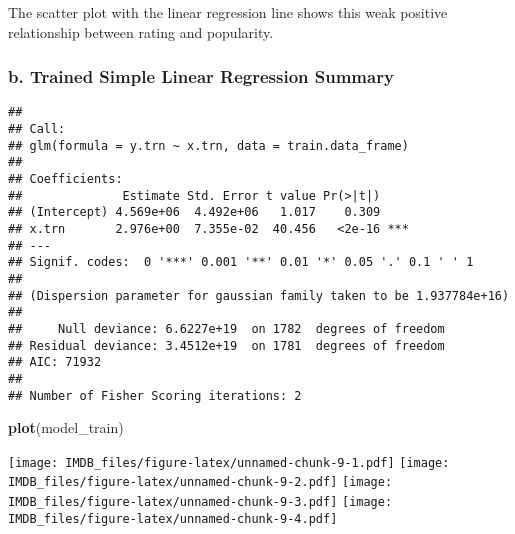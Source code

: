 \documentclass[
]{article}
\newenvironment{Shaded}{\begin{snugshade}}{\end{snugshade}}
\newcommand{\AttributeTok}[1]{\textcolor[rgb]{0.13,0.29,0.53}{#1}}
\newcommand{\FunctionTok}[1]{\textcolor[rgb]{0.13,0.29,0.53}{\textbf{#1}}}
\newcommand{\NormalTok}[1]{#1}
\newcommand{\OtherTok}[1]{\textcolor[rgb]{0.56,0.35,0.01}{#1}}
\newcommand{\SpecialCharTok}[1]{\textcolor[rgb]{0.81,0.36,0.00}{\textbf{#1}}}
\begin{document}
The scatter plot with the linear regression line shows this weak
positive relationship between rating and popularity.

\subsubsection{b. Trained Simple Linear Regression
Summary}\label{b.-trained-simple-linear-regression-summary}

\begin{Shaded}
\end{Shaded}

\begin{verbatim}
## 
## Call:
## glm(formula = y.trn ~ x.trn, data = train.data_frame)
## 
## Coefficients:
##              Estimate Std. Error t value Pr(>|t|)    
## (Intercept) 4.569e+06  4.492e+06   1.017    0.309    
## x.trn       2.976e+00  7.355e-02  40.456   <2e-16 ***
## ---
## Signif. codes:  0 '***' 0.001 '**' 0.01 '*' 0.05 '.' 0.1 ' ' 1
## 
## (Dispersion parameter for gaussian family taken to be 1.937784e+16)
## 
##     Null deviance: 6.6227e+19  on 1782  degrees of freedom
## Residual deviance: 3.4512e+19  on 1781  degrees of freedom
## AIC: 71932
## 
## Number of Fisher Scoring iterations: 2
\end{verbatim}

\begin{Shaded}
\begin{Highlighting}[]
\FunctionTok{plot}\NormalTok{(model\_train)}
\end{Highlighting}
\end{Shaded}

\texttt{[image: IMDB\_files/figure-latex/unnamed-chunk-9-1.pdf]}
\texttt{[image: IMDB\_files/figure-latex/unnamed-chunk-9-2.pdf]}
\texttt{[image: IMDB\_files/figure-latex/unnamed-chunk-9-3.pdf]}
\texttt{[image: IMDB\_files/figure-latex/unnamed-chunk-9-4.pdf]}
\end{document}
